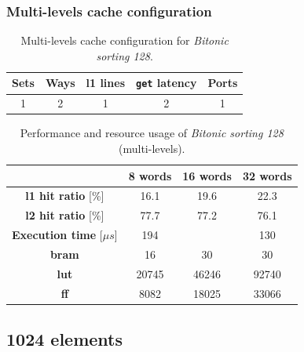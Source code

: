 \documentclass[11pt,a4paper,oneside]{memoir}
\begin{document}
\subsubsection{Multi-levels cache configuration}
\begin{table}[H]
	\begin{center}
		\begin{tabular}{ccccc}
			\hline
			\rowcolor{gray!50}
			\textbf{Sets} & \textbf{Ways} & \textbf{\ac{l1} lines} &
			\textbf{\texttt{get} latency} & \textbf{Ports} \\
			\hline
			1 & 2 & 1 & 2 & 1 \\
			\hline
		\end{tabular}
	\end{center}
	\caption{Multi-levels cache configuration for \emph{Bitonic sorting 128}.}
	\label{tab:bitonic_128_l1_config}
\end{table}

\begin{table}[H]
	\begin{center}
		\begin{tabular}{cccc}
			\hline
			\rowcolor{gray!50}
			& \textbf{8 words} & \textbf{16 words} & \textbf{32 words} \\
			\hline
			\textbf{\ac{l1} hit ratio} [\%] & 16.1 & 19.6 & 22.3 \\
			\rowcolor{gray!25}
			\textbf{\ac{l2} hit ratio} [\%] & 77.7 & 77.2 & 76.1 \\
			\textbf{Execution time} [$\mu s$] & 194 & & 130 \\
			\rowcolor{gray!25}
			\textbf{\ac{bram}} & 16 & 30 & 30 \\
			\textbf{\acs{lut}} & 20745 & 46246 & 92740 \\
			\rowcolor{gray!25}
			\textbf{\acs{ff}} & 8082 & 18025 & 33066 \\
			\hline
		\end{tabular}
	\end{center}
	\caption{Performance and resource usage of \emph{Bitonic sorting 128} (multi-levels).}
	\label{tab:bitonic_128_l1_report}
\end{table}

\subsection{1024 elements}
\end{document}
